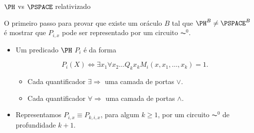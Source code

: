 \documentclass[landscape, 9pt]{beamer}
\begin{document}
\begin{frame} {$\PH$ vs $\PSPACE$ relativizado}

O primeiro passo para provar que existe um oráculo $B$ tal que $\PH^{B} \neq \PSPACE^{B}$ é mostrar que $P_{i, x}$ pode ser representado por um circuito $\AC^{0}$.

\begin{itemize}

	\item Um predicado $\PH$ $P_{i}$ é da forma
	
	\begin{equation*}
		P_{i}(X) \iff \exists x_{1} \forall x_{2} \dots Q_{k} x_{k} M_{i}(x, x_{1}, \dots, x_{k}) = 1.
	\end{equation*}
	
	\begin{itemize}
	
		\item Cada quantificador $\exists \Rightarrow$ uma camada de portas $\lor$.
		
		\item Cada quantificador $\forall \Rightarrow$ uma camada de portas $\land$.
	
	\end{itemize}
	
	\item Representamos $P_{i, x} \equiv P_{k, i, x}$, para algum $k \geq 1$, por um circuito $\AC^{0}$ de profundidade $k + 1$.

\end{itemize}

\end{frame}

\end{document}
